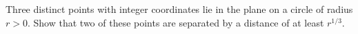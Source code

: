 Three distinct points with integer coordinates lie in the plane on a
circle of radius $r>0$.  Show that two of these points are separated by a
distance of at least $r^{1/3}$.
